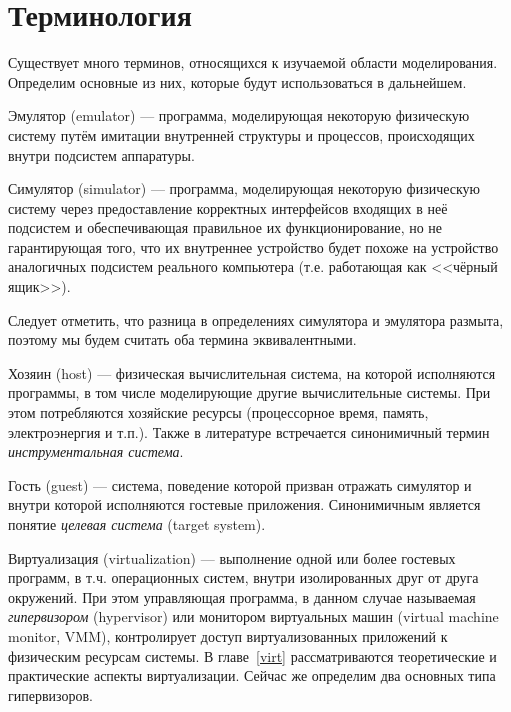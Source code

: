 \section{Терминология}

Существует много терминов, относящихся к изучаемой области моделирования. Определим основные из них, которые будут использоваться в дальнейшем.

\begin{description*}

\item[Эмулятор] (\abbr emulator) --- программа, моделирующая некоторую физическую систему путём имитации внутренней структуры и процессов, происходящих внутри подсистем аппаратуры.

\item[Симулятор] (\abbr simulator) --- программа, моделирующая некоторую физическую систему через предоставление корректных интерфейсов входящих в неё подсистем и обеспечивающая правильное их функционирование, но не гарантирующая того, что их внутреннее устройство будет похоже на устройство аналогичных подсистем реального компьютера (т.е. работающая как <<чёрный ящик>>). 

Следует отметить, что разница в определениях симулятора и эмулятора размыта, поэтому мы будем считать оба термина эквивалентными.

\item[Хозяин] (\abbr host) ---  физическая вычислительная система, на которой исполняются программы, в том числе моделирующие другие вычислительные системы. При этом потребляются хозяйские ресурсы (процессорное время, память, электроэнергия и т.п.). Также в литературе встречается синонимичный термин \textit{инструментальная система}.

\item[Гость] (\abbr guest) ---  система, поведение которой призван отражать симулятор и внутри которой исполняются гостевые приложения. Синонимичным является понятие \textit{целевая система} (\abbr target system).

\item[Виртуализация] (\abbr virtualization) --- выполнение одной или более гостевых программ, в т.ч. операционных систем, внутри изолированных друг от друга окружений. При этом управляющая программа, в данном случае называемая \textit{гипервизором} (\abbr hypervisor) или монитором виртуальных машин (\abbr virtual machine monitor, VMM), контролирует доступ виртуализованных приложений к физическим ресурсам системы.  В главе~\ref{virt} рассматриваются теоретические и практические аспекты виртуализации. Сейчас же определим два основных типа гипервизоров.


\end{description*}
